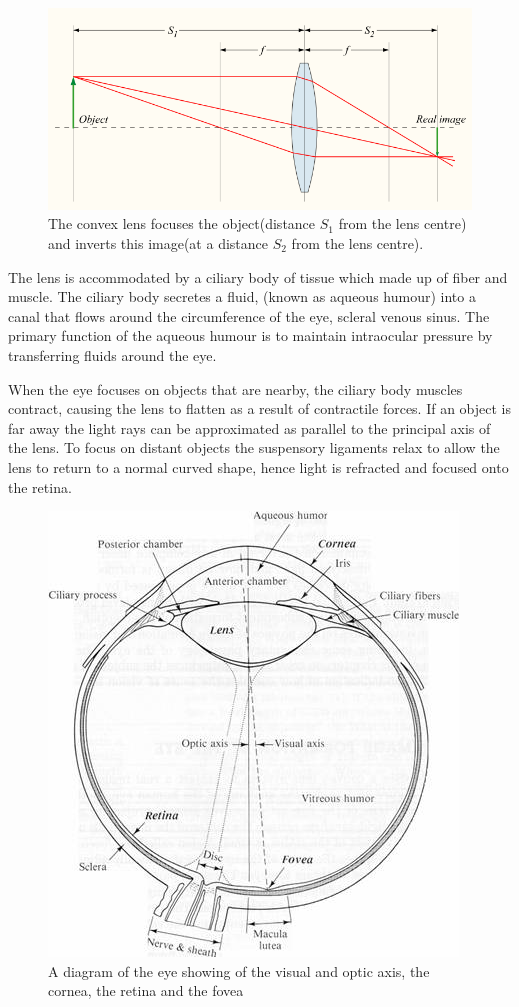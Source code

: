 \begin{figure}[htbp]
\centering
  \includegraphics{figures/convergent_lens2}
\caption{The convex lens focuses the object(distance $S_1$ from the lens centre)
         and inverts this image(at a distance $S_2$ from the lens centre).
         \cite{greivenkamp2004field}}
\label{fig:convergent_lens}
\end{figure}

The lens is accommodated by a ciliary body of tissue which made up of fiber and
muscle. The ciliary body secretes a fluid, (known as aqueous humour) into a canal
that flows around the circumference of the eye, scleral venous sinus.
\cite{bill1970effects,dvorak1934schlemm} The primary function of the aqueous humour
is to maintain intraocular pressure by transferring fluids around the eye.

When the eye focuses on objects that are nearby, the ciliary body muscles contract,
causing the lens to flatten as a result of contractile forces. If an object is far
away the light rays can be approximated as parallel to the principal axis of the lens.
To focus on distant objects the suspensory ligaments relax to allow the lens to return
to a normal curved shape, hence light is refracted and focused onto the retina.

\begin{figure}[!htbp]
\centering
  \includegraphics{figures/eye_diagram}
\caption{A diagram of the eye showing of the visual
 and optic axis, the cornea, the retina and the fovea}
\label{fig:optic_axis}
\end{figure}

